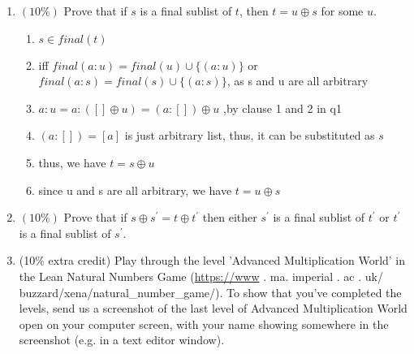 \documentclass[10pt]{article}
\begin{document}
\begin{enumerate}
  \item $(10 \%)$ Prove that if $s$ is a final sublist of $t$, then $t=u \oplus s$ for some $u$.
  \begin{enumerate}
    \item $s \in final (t)$
    \item iff $final(a : u) = final(u) \cup \{(a:u)\}$ or $ final(a:s) = final(s) \cup \{(a:s)\}$, as s and u are all arbitrary
    \item $ a : u = a : ([]\oplus u) = (a : []) \oplus u$ ,by clause 1 and 2 in {q1}
    \item $(a:[]) = [a]$ is just arbitrary list, thus, it can be substituted as $s$ 
    \item thus, we have $t = s \oplus u $
    \item since u and s are all arbitrary, we have $t = u \oplus s$
  \end{enumerate}

  \item $(10 \%)$ Prove that if $s \oplus s^{\prime}=t \oplus t^{\prime}$ then either $s^{\prime}$ is a final sublist of $t^{\prime}$ or $t^{\prime}$ is a final sublist of $s^{\prime}$.

  \item (10\% extra credit) Play through the level 'Advanced Multiplication World' in the Lean Natural Numbers Game (\href{https://www}{https://www} . ma. imperial . ac . uk/ buzzard/xena/natural\_number\_game/). To show that you've completed the levels, send us a screenshot of the last level of Advanced Multiplication World open on your computer screen, with your name showing somewhere in the screenshot (e.g. in a text editor window).

\end{enumerate}
\end{document}
